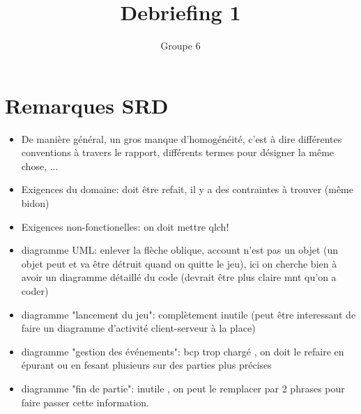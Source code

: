 \documentclass{article}
\title{Debriefing 1}
\author{Groupe 6}
\date{}
\begin{document}
\maketitle
\section{Remarques SRD}
\begin{itemize}
\item De manière général, un gros manque d'homogénéité, c'est à dire différentes conventions à travers le rapport, différents termes pour désigner la même chose, ...
\item Exigences du domaine: doit être refait, il y a des contraintes à trouver (même bidon)
\item Exigences non-fonctionelles: on doit mettre qlch!
\item diagramme UML: enlever la flèche oblique, account n'est pas un objet (un objet peut et va être détruit quand on quitte le jeu), ici on cherche bien à avoir un diagramme détaillé du code (devrait être plus claire mnt qu'on a coder)
\item diagramme "lancement du jeu": complètement inutile (peut être interessant de faire un diagramme d'activité client-serveur à la place)
\item diagramme "gestion des événements": bcp trop chargé , on doit le refaire en épurant ou en fesant plusieurs sur des parties plus précises
\item diagramme "fin de partie": inutile , on peut le remplacer par 2 phrases pour faire passer cette information.
\end{itemize}
\end{document}
